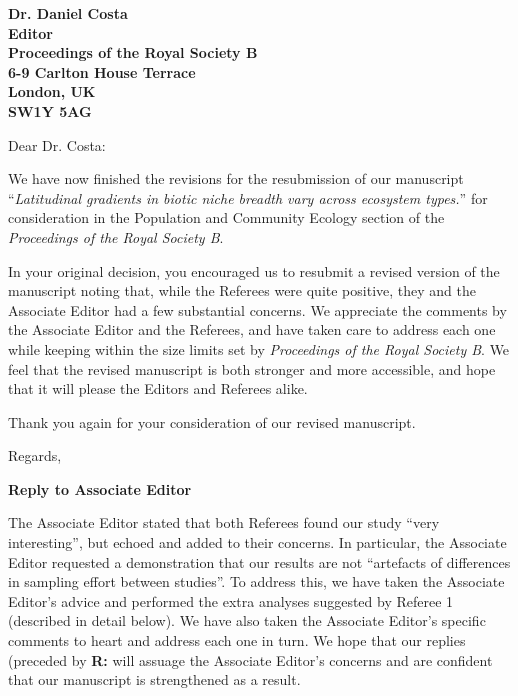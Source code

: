 \documentclass[12pt]{letter}
\newcommand{\mytitle}{\emph{Latitudinal gradients in biotic niche breadth vary across ecosystem types.}}
\newcommand{\myjournal}{\emph{Proceedings of the Royal Society B}}
\begin{document}
\begin{letter}{\bf Dr. Daniel Costa\\
               Editor\\
               Proceedings of the Royal Society B\\
               6-9 Carlton House Terrace\\
               London, UK\\
               SW1Y 5AG\\
                }

\opening{Dear Dr. Costa:}

We have now finished the revisions for the resubmission of our manuscript
``\mytitle'' for consideration in the Population and Community Ecology section
of the \myjournal. 

In your original decision, you encouraged us to resubmit a revised version of
the manuscript noting that, while the Referees were quite positive, they and
the Associate Editor had a few substantial concerns. We appreciate the
comments by the Associate Editor and the Referees, and have taken care to
address each one while keeping within the size limits set by \myjournal. We
feel that the revised manuscript is both stronger and more accessible, and
hope that it will please the Editors and Referees alike.


Thank you again for your consideration of our revised manuscript.

\closing{Regards,}


\end{letter}

\newpage

\setcounter{page}{1}


{\Large \bf Reply to Associate Editor}

  The Associate Editor stated that both Referees found our study ``very
  interesting'', but echoed and added to their concerns. In particular, the
  Associate Editor requested a demonstration that our results are not
  ``artefacts of differences in sampling effort between studies''. To address
  this, we have taken the Associate Editor's advice and performed the extra
  analyses suggested by Referee 1 (described in detail below). We have also
  taken the Associate Editor's specific comments to heart and address each one
  in turn. We hope that our replies (preceded by \textbf{R:} 
  will assuage the Associate Editor's concerns and are 
  confident that our manuscript is strengthened as a result.
\end{document}
